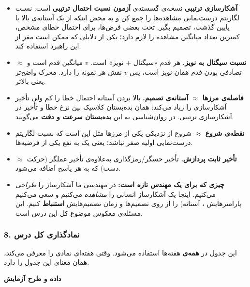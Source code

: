 \begin{itemize}
\tightlist
\item
  \textbf{آشکارسازی ترتیبی }  نسخه‌ی گسسته‌ی \textbf{آزمون نسبت احتمال ترتیبی }
  است: نسبت لگاریتم درست‌نمایی مشاهده‌ها را جمع کن و به محض اینکه از یک
  آستانه‌ی بالا یا پایین گذشت، تصمیم بگیر. تحت بعضی فرض‌ها،  برای
  احتمال خطای مشخص، کمترین تعداد میانگین مشاهده را لازم دارد؛ یکی از
  دلایلی که ممکن است مغز از این راهبرد استفاده کند.
\item
  \textbf{ \ensuremath{\approx} نسبت سیگنال به نویز.} هر قدم «سیگنال + نویز» است.
   \(v\) میانگین قدم است و تصادفی بودن قدم همان نویز است، پس
  \(v\) نقش  هر نمونه را دارد. محرک واضح‌تر یعنی  بالاتر.
\item
  \textbf{فاصله‌ی مرزها \ensuremath{\approx} آستانه‌ی تصمیم.} بالا بردن آستانه احتمال خطا را
  کم ولی تأخیر آشکارسازی را زیاد می‌کند: همان بده‌بستان کلاسیک بین نرخ خطا
  و تأخیر در آشکارسازی ترتیبی. در روان‌شناسی به این \textbf{بده‌بستان سرعت
  و دقت} می‌گویند.
\item
  \textbf{نقطه‌ی شروع \ensuremath{\approx} } شروع از نزدیکی یکی از مرزها مثل این
  است که نسبت لگاریتم درست‌نمایی اولیه صفر نباشد؛ یعنی یک  به
  نفع یکی از فرضیه‌ها.
\item
  \textbf{ \ensuremath{\approx} تأخیر ثابت پردازش.} تأخیر
  حسگر/رمزگذاری به‌علاوه‌ی تأخیر عملگر (حرکت دست) که به هر پاسخ اضافه
  می‌شود.
\item
  \textbf{چیزی که برای یک مهندس تازه است:} در مهندسی ما آشکارساز را
  \emph{طراحی} می‌کنیم. اینجا یک آشکارساز انسانی را \emph{مشاهده} می‌کنیم
  و سعی می‌کنیم پارامترهایش ، آستانه) را از روی تصمیم‌ها و زمان
  تصمیم‌هایش \textbf{استنباط} کنیم. این مسئله‌ی معکوس موضوع کل این درس
  است.
\end{itemize}

\subsubsection{8. نمادگذاری کل درس}

این جدول در \textbf{همه‌ی} هفته‌ها استفاده می‌شود. وقتی هفته‌ای نمادی را
معرفی می‌کند، همان معنای این جدول را دارد.

\textbf{داده و طرح آزمایش}

